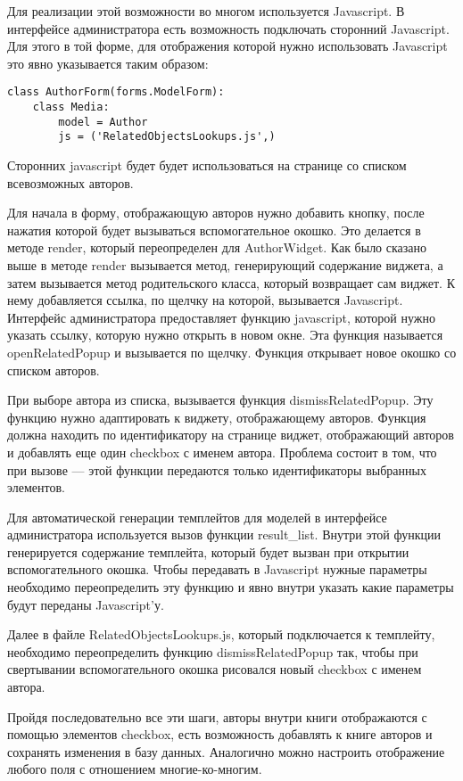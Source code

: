 \documentclass[a4paper]{report}
\begin{document}
Для реализации этой возможности во многом используется Javascript. В интерфейсе администратора есть возможность подключать сторонний Javascript. Для этого в той форме, для отображения которой нужно использовать Javascript это явно указывается таким образом:

{
\small \begin{verbatim}
class AuthorForm(forms.ModelForm):
    class Media:
    	model = Author
        js = ('RelatedObjectsLookups.js',)

\end{verbatim}
}

Сторонних javascript будет будет использоваться на странице со списком всевозможных авторов.

Для начала в форму, отображающую авторов нужно добавить кнопку, после нажатия которой будет вызываться вспомогательное окошко. Это делается в методе render, который переопределен для AuthorWidget. Как было сказано выше в методе render вызывается метод, генерирующий содержание виджета, а затем вызывается метод родительского класса, который возвращает сам виджет. К нему добавляется ссылка, по щелчку на которой, вызывается Javascript. Интерфейс администратора предоставляет функцию javascript, которой нужно указать ссылку, которую нужно открыть в новом окне. Эта функция называется openRelatedPopup и вызывается по щелчку. Функция открывает новое окошко со списком авторов.

При выборе автора из списка, вызывается функция dismissRelatedPopup. Эту функцию нужно адаптировать к виджету, отображающему авторов. Функция должна находить по идентификатору на странице виджет, отображающий авторов и добавлять еще один checkbox с именем автора. Проблема состоит в том, что при вызове --- этой функции передаются только идентификаторы выбранных элементов.

Для автоматической генерации темплейтов для моделей в интерфейсе администратора используется вызов функции result\_list. Внутри этой функции генерируется содержание темплейта, который будет вызван при открытии вспомогательного окошка. Чтобы передавать в Javascript нужные параметры необходимо переопределить эту функцию и явно внутри указать какие параметры будут переданы Javascript'у.

Далее в файле RelatedObjectsLookups.js, который подключается к темплейту, необходимо переопределить функцию dismissRelatedPopup так, чтобы при свертывании вспомогательного окошка рисовался новый checkbox с именем автора. 

Пройдя последовательно все эти шаги, авторы внутри книги отображаются с помощью элементов checkbox, есть возможность добавлять к книге авторов и сохранять изменения в базу данных. Аналогично можно настроить отображение любого поля с отношением многие-ко-многим.
\end{document}
